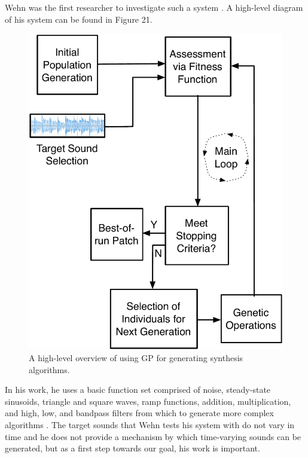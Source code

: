 \documentclass[12pt]{report} 	%
\numberwithin{figure}{chapter}
\numberwithin{table}{chapter}
\numberwithin{equation}{chapter}
\begin{document}
\begin{flushleft}
Wehn was the first researcher to investigate such a system \cite{Wehn:1998bh}. A high-level diagram of his system can be found in Figure 21.
\begin{figure}[h!]
\begin{center}
\includegraphics[scale = 0.6]{SimpleSystem}
\caption[GP for sound synthesis]{A high-level overview of using GP for generating synthesis algorithms.}
\end{center}
\end{figure}
In his work, he uses a basic function set comprised of noise, steady-state sinusoids, triangle and square waves, ramp functions, addition, multiplication, and high, low, and bandpass filters from which to generate more complex algorithms \cite[p. 2]{Wehn:1998bh}. The target sounds that Wehn tests his system with do not vary in time and he does not provide a mechanism by which time-varying sounds can be generated, but as a first step towards our goal, his work is important.


\end{flushleft}
\end{document}
